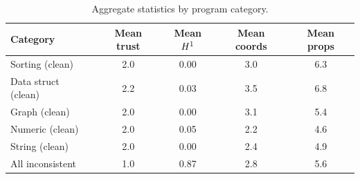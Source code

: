 \documentclass[11pt]{article}
\begin{document}
\begin{table}[H]
\centering
\caption{Aggregate statistics by program category.}
\label{tab:aggregate}
\small
\begin{tabular}{@{}lcccc@{}}
\toprule
\textbf{Category} & \textbf{Mean trust}
  & \textbf{Mean $H^{1}$} & \textbf{Mean coords}
  & \textbf{Mean props} \\
\midrule
Sorting (clean)      & 2.0 & 0.00 & 3.0 & 6.3 \\
Data struct (clean)  & 2.2 & 0.03 & 3.5 & 6.8 \\
Graph (clean)        & 2.0 & 0.00 & 3.1 & 5.4 \\
Numeric (clean)      & 2.0 & 0.05 & 2.2 & 4.6 \\
String (clean)       & 2.0 & 0.00 & 2.4 & 4.9 \\
\midrule
All inconsistent     & 1.0 & 0.87 & 2.8 & 5.6 \\
\bottomrule
\end{tabular}
\end{table}
\end{document}
